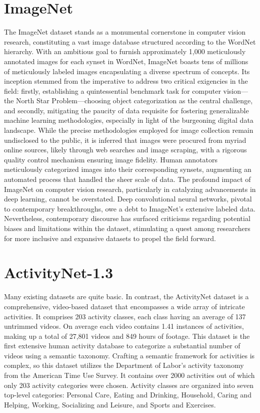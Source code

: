 \section{ImageNet}
The ImageNet dataset \parencite{image-net} stands as a monumental cornerstone in computer vision research, constituting a vast image database structured according to the WordNet hierarchy. With an ambitious goal to furnish approximately 1,000 meticulously annotated images for each synset in WordNet, ImageNet boasts tens of millions of meticulously labeled images encapsulating a diverse spectrum of concepts. Its inception stemmed from the imperative to address two critical exigencies in the field: firstly, establishing a quintessential benchmark task for computer vision—the North Star Problem—choosing object categorization as the central challenge, and secondly, mitigating the paucity of data requisite for fostering generalizable machine learning methodologies, especially in light of the burgeoning digital data landscape. While the precise methodologies employed for image collection remain undisclosed to the public, it is inferred that images were procured from myriad online sources, likely through web searches and image scraping, with a rigorous quality control mechanism ensuring image fidelity. Human annotators meticulously categorized images into their corresponding synsets, augmenting an automated process that handled the sheer scale of data. The profound impact of ImageNet on computer vision research, particularly in catalyzing advancements in deep learning, cannot be overstated. Deep convolutional neural networks, pivotal to contemporary breakthroughs, owe a debt to ImageNet's extensive labeled data. Nevertheless, contemporary discourse has surfaced criticisms regarding potential biases and limitations within the dataset, stimulating a quest among researchers for more inclusive and expansive datasets to propel the field forward.

\section{ActivityNet-1.3}
Many existing datasets are quite basic. In contrast, the ActivityNet dataset \parencite{activity-net} is a comprehensive, video-based dataset that encompasses a wide array of intricate activities. It comprises 203 activity classes, each class having an average of 137 untrimmed videos. On average each video contains 1.41 instances of activities, making up a total of 27,801 videos and 849 hours of footage. This dataset is the first extensive human activity database to categorize a substantial number of videos using a semantic taxonomy. Crafting a semantic framework for activities is complex, so this dataset utilizes the Department of Labor's activity taxonomy from the American Time Use Survey. It contains over 2000 activities out of which only 203 activity categories were chosen. Activity classes are organized into seven top-level categories: Personal Care, Eating and Drinking, Household, Caring and Helping, Working, Socializing and Leisure, and Sports and Exercises.

